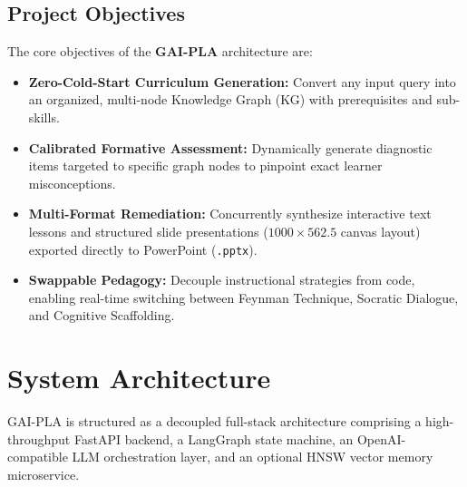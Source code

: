 \documentclass[12pt,a4paper]{article}
\begin{document}
\subsection{Project Objectives}
The core objectives of the \textbf{GAI-PLA} architecture are:
\begin{itemize}
    \item \textbf{Zero-Cold-Start Curriculum Generation:} Convert any input query into an organized, multi-node Knowledge Graph (KG) with prerequisites and sub-skills.
    \item \textbf{Calibrated Formative Assessment:} Dynamically generate diagnostic items targeted to specific graph nodes to pinpoint exact learner misconceptions.
    \item \textbf{Multi-Format Remediation:} Concurrently synthesize interactive text lessons and structured slide presentations ($1000 \times 562.5$ canvas layout) exported directly to PowerPoint (\texttt{.pptx}).
    \item \textbf{Swappable Pedagogy:} Decouple instructional strategies from code, enabling real-time switching between Feynman Technique, Socratic Dialogue, and Cognitive Scaffolding.
\end{itemize}

\section{System Architecture}

GAI-PLA is structured as a decoupled full-stack architecture comprising a high-throughput FastAPI backend, a LangGraph state machine, an OpenAI-compatible LLM orchestration layer, and an optional HNSW vector memory microservice.
\end{document}
